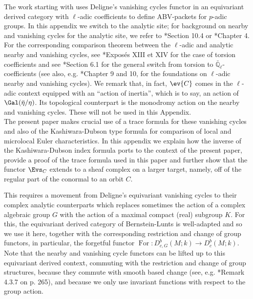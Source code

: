 \documentclass[11pt,letterpaper]{amsart}
\numberwithin{equation}{section}
\begin{document}
The work starting with \cite{CFMMX22} uses  Deligne's vanishing cycles functor in an equivariant derived category with $\ell$-adic coefficients to define ABV-packets for $p$-adic groups.
In this appendix we switch to the analytic site; for background on nearby and vanishing cycles for the analytic site, we refer to
\cite{MS22}*{Section 10.4} or \cite{Ach21}*{Chapter 4}.
For the corresponding comparison theorem between the $\ell$-adic and analytic nearby and vanishing cycles, see
 \cite{SGA7II}*{Expos\'{e}s XIII et XIV} for the case of torsion coefficients and see
\cite{BBD82}*{Section 6.1} for the general switch from torsion to 
$\bar{\mathbb{Q}}_\ell$-coefficients
(see also, e.g. \cite{Fu11}*{Chapter 9 and 10}, for the foundations on $\ell$-adic
  nearby and vanishing cycles).
We remark that, in fact, $\ev{C}$ comes in the $\ell$-adic context
equipped with an ``action of inertia'', which is to say, an action of $\Gal({\bar \eta}/\eta)$. Its topological counterpart is the monodromy action on the nearby and vanishing cycles. These will not be used in this Appendix.\\



The present paper makes crucial use of a trace formula for these vanishing cycles and also of the Kashiwara-Dubson type formula for comparison of local and microlocal Euler characteristics. 
In this appendix we explain how the inverse of the Kashiwara-Dubson index formula ports to the context of the present paper, provide a proof of the trace formula used in this paper and further show that the functor $\Evs_C$ extends to a sheaf complex on a larger target, namely, off of the regular part of the conormal to an orbit $C$.

This requires a movement from Deligne's equivariant vanishing cycles to their complex analytic counterparts which replaces sometimes the action of a complex algebraic group $G$ with the action of a maximal compact (real) subgroup $K$.
For this, the equivariant derived category of Bernstein-Lunts \cite{BL94} is well-adapted and so we use it here, together with the corresponding restriction and change of group functors, in particular, the forgetful functor $\operatorname{For}: D^b_{c,G}(M;k) \to D^b_{c}(M;k)$.
Note that the nearby and vanishing cycle functors can be lifted up to this equivariant derived context, commuting with the restriction and change of group structures, because they commute with smooth based change
(see, e.g. \cite{Sch03}*{Remark 4.3.7 on p. 265}), and because we only use invariant functions with respect to the group action. 
\end{document}
